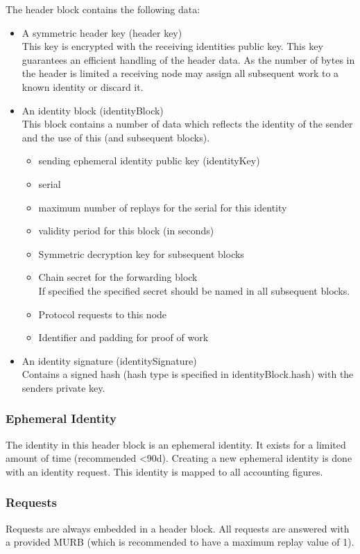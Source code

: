 The header block contains the following data:
\begin{itemize}
	\item A symmetric header key (header key)\\
	      This key is encrypted with the receiving identities public key. This key guarantees an efficient handling of the header data. As the number of bytes in the header is limited a receiving node may assign all subsequent work to a known identity or discard it.
	\item An identity block (identityBlock)\\
		  This block contains a number of data which reflects the identity of the sender and the use of this (and subsequent blocks).
		  \begin{itemize}
		  	\item sending ephemeral identity public key (identityKey)
		  	\item serial
		  	\item maximum number of replays for the serial for this identity
		  	\item validity period for this block (in seconds)
		  	\item Symmetric decryption key for subsequent blocks
		  	\item Chain secret for the forwarding block\\
		  	      If specified the specified secret should be named in all subsequent blocks.
		  	\item Protocol requests to this node
		  	\item Identifier and padding for proof of work
		  \end{itemize}
	\item An identity signature (identitySignature)\\
	      Contains a signed hash (hash type is specified in identityBlock.hash) with the senders private key.
\end{itemize}

\subsubsection{Ephemeral Identity}
The identity in this header block is an ephemeral identity. It exists for a limited amount of time (recommended <90d). Creating a new ephemeral identity is done with an identity request. This identity is mapped to all accounting figures.

\subsubsection{Requests}
Requests are always embedded in a header block. All requests are answered with a provided MURB (which is recommended to have a maximum replay value of 1).

